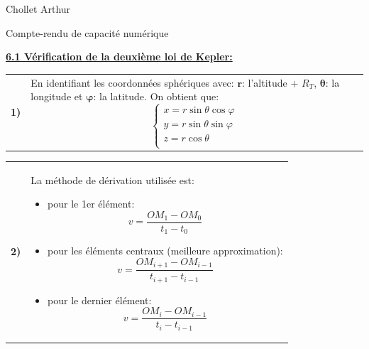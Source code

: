 \documentclass{article}
\newcommand{\expart}[1]
{
    \textbf{\underline{#1:}} \par 
}
\newcommand{\question}[2]
{
    \begin{tabularx}{\linewidth}{lX}
        \textbf{#1)} & {#2}
    \end{tabularx} 
}
\begin{document}
Chollet Arthur

\begin{center}
  \Huge
  \normalfont\calligra Compte-rendu de capacité numérique
\end{center}

\expart{6.1 Vérification de la deuxième loi de Kepler}

\question{1}{
  En identifiant les coordonnées sphériques avec: $\boldsymbol{r}$: l'altitude + $R_T$, $\boldsymbol{\theta}$: la longitude et $\boldsymbol{\varphi}$: la latitude. On obtient que:
  $$
  \boxed{\begin{cases}
    x=r\sin\theta\cos\varphi\\
    y=r\sin\theta\sin\varphi\\
    z=r\cos\theta\\
  \end{cases}}
  $$
}

\question{2}{
  La méthode de dérivation utilisée est:
  \begin{itemize}
    \item pour le 1er élément:
    $$
      v=\frac{OM_1-OM_0}{t_{1}-t_{0}}
    $$
    \item pour les éléments centraux (meilleure approximation):
    $$
      v=\frac{OM_{i+1}-OM_{i-1}}{t_{i+1}-t_{i-1}}
    $$
    \item pour le dernier élément:
    $$
      v=\frac{OM_{i}-OM_{i-1}}{t_{i}-t_{i-1}}
    $$
\end{itemize}
}
\end{document}
